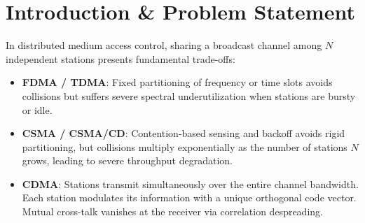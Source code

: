 \documentclass[11pt,a4paper]{article}
\begin{document}
\begin{abstract}
Code Division Multiple Access (CDMA) is a spread-spectrum multiple access technology that enables concurrent, uncoordinated transmission across a shared, unpartitioned communication channel. In contrast to contention-based schemes (e.g., CSMA/CD in Assignment 3) that suffer performance collapse under heavy load, CDMA achieves orthogonal code-space multiplexing where simultaneous transmissions superimpose linearly on the wire and are mathematically separated at the receiver with zero cross-talk. In this assignment, I implemented a full-featured, distributed CDMA network simulation in modern C++17 using POSIX TCP stream sockets. Each station is assigned a unique, mutually orthogonal chip sequence from a Walsh Set generated via Sylvester's construction of Hadamard matrices. I performed rigorous benchmarking under both \textbf{No-Noise (Ideal Channel)} and \textbf{Noise-Impaired (AWGN Channel)} regimes across station scaling ($N \in [2, 32]$), spreading dimensions ($M \in [2, 32]$), and continuous Gaussian noise variances ($\sigma \in [0.0, 2.0]$). Experimental results demonstrate $100\%$ zero-error recovery across all $3^4 = 81$ input permutations, sub-millisecond round barrier synchronization, concurrent multi-station text broadcast, and empirical validation of the spread-spectrum processing gain ($10 \log_{10} M$) matching theoretical $Q$-function bounds.
\end{abstract}

\section{Introduction \& Problem Statement}
In distributed medium access control, sharing a broadcast channel among $N$ independent stations presents fundamental trade-offs:
\begin{itemize}[leftmargin=*]
    \item \textbf{FDMA / TDMA}: Fixed partitioning of frequency or time slots avoids collisions but suffers severe spectral underutilization when stations are bursty or idle.
    \item \textbf{CSMA / CSMA/CD}: Contention-based sensing and backoff avoids rigid partitioning, but collisions multiply exponentially as the number of stations $N$ grows, leading to severe throughput degradation.
    \item \textbf{CDMA}: Stations transmit simultaneously over the entire channel bandwidth. Each station modulates its information with a unique orthogonal code vector. Mutual cross-talk vanishes at the receiver via correlation despreading.
\end{itemize}
\end{document}
